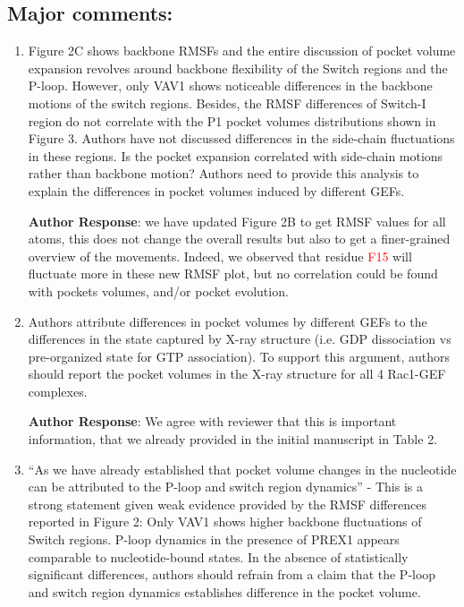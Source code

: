 \documentclass[11pt, a4paper]{article}
\begin{document}
\subsection{Major comments:}
 \begin{enumerate}   
    \item Figure 2C shows backbone RMSFs and the entire discussion of pocket volume expansion revolves around backbone flexibility of the Switch regions and the P-loop. However, only VAV1 shows noticeable differences in the backbone motions of the switch regions. Besides, the RMSF differences of Switch-I region do not correlate with the P1 pocket volumes distributions shown in Figure 3. Authors have not discussed differences in the side-chain fluctuations in these regions. Is the pocket expansion correlated with side-chain motions rather than backbone motion? Authors need to provide this analysis to explain the differences in pocket volumes induced by different GEFs.

\textbf{Author Response}: we have updated Figure 2B to get RMSF values for all atoms, this does not change the overall results but also to get a finer-grained overview of the movements. Indeed, we observed that residue \textcolor{red}{F15} will fluctuate more in these new RMSF plot, but no correlation could be found with pockets volumes, and/or pocket evolution.

    \item Authors attribute differences in pocket volumes by different GEFs to the differences in the state captured by X-ray structure (i.e. GDP dissociation vs pre-organized state for GTP association). To support this argument, authors should report the pocket volumes in the X-ray structure for all 4 Rac1-GEF complexes.

\textbf{Author Response}: We agree with reviewer that this is important information, that we already provided in the initial manuscript in Table 2.

    \item “As we have already established that pocket volume changes in the nucleotide can be attributed to the P-loop and switch region dynamics” - This is a strong statement given weak evidence provided by the RMSF differences reported in Figure 2: Only VAV1 shows higher backbone fluctuations of Switch regions. P-loop dynamics in the presence of PREX1 appears comparable to nucleotide-bound states. In the absence of statistically significant differences, authors should refrain from a claim that the P-loop and switch region dynamics establishes difference in the pocket volume.


\end{enumerate}
\end{document}
